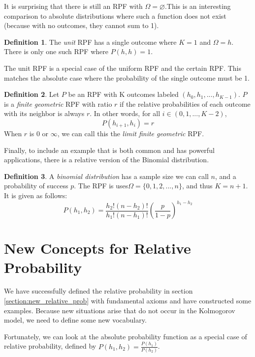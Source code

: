 \documentclass[twoside]{article}
\theoremstyle{plain}%
\theoremstyle{definition}
\newtheorem{definition}{Definition}[section]
\theoremstyle{remark}
\begin{document}
It is surprising that there is still an RPF with \(\Omega = \varnothing\).This is an interesting comparison to absolute distributions where such a function does not exist (because with no outcomes, they cannot sum to 1).

\begin{definition}
\label{def:unit_rpf}
The \textit{unit} RPF has a single outcome where \(K = 1\) and \(\Omega = h\). There is only one such RPF where \(P(h, h) = 1\).
\end{definition}

The unit RPF is a special case of the uniform RPF and the certain RPF. This matches the absolute case where the probability of the single outcome must be 1.

\begin{definition}
\label{def:finite_geometric_rpf}
Let \(P\) be an RPF with K outcomes labeled \((h_0, h_1, ..., h_{K-1})\). \(P\) is a \textit{finite geometric} RPF with ratio \(r\) if the relative probabilities of each outcome with its neighbor is always \(r\). In other words, for all \(i \in (0, 1, ..., K-2)\),
\[P(h_{i+1}, h_i) = r\]
When \(r\) is 0 or \(\infty\), we can call this the \textit{limit finite geometric} RPF.
\end{definition}

Finally, to include an example that is both common and has powerful applications, there is a relative version of the Binomial distribution.

\begin{definition}
\label{def:binomial_rpf}
A \textit{binomial distribution} has a sample size we can call \(n\), and a probability of success \(p\). The RPF is uses\(\Omega = \{0, 1, 2, ..., n\}\), and thus \(K = n + 1\). It is given as follows:
\[P(h_1, h_2) = \frac{h_2!(n-h_2)!}{h_1!(n-h_1)!}\left(\frac{p}{1-p}\right)^{h_1 - h_2}\]
\end{definition}


\section{New Concepts for Relative Probability}

We have successfully defined the relative probability in section \ref{section:new_relative_prob} with fundamental axioms and have constructed some examples. Because new situations arise that do not occur in the Kolmogorov model, we need to define some new vocabulary.

Fortunately, we can look at the absolute probability function as a special case of relative probability, defined by \(P(h_1, h_2) = \frac{P(h_1)}{P(h_2)}\).
\end{document}
